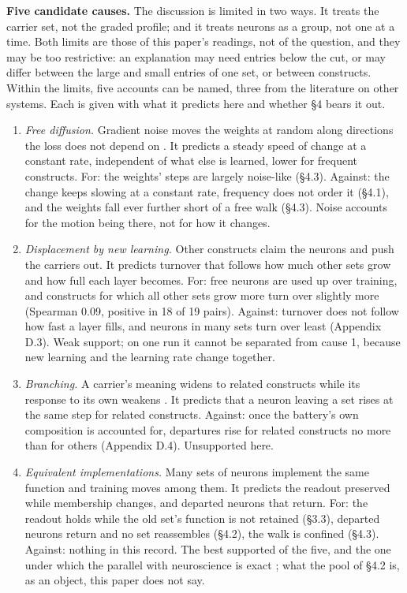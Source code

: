 \documentclass{article}
\begin{document}
\textbf{Five candidate causes.} The discussion is limited in two ways. It treats the carrier set, not the graded profile; and it treats neurons as a group, not one at a time. Both limits are those of this paper's readings, not of the question, and they may be too restrictive: an explanation may need entries below the cut, or may differ between the large and small entries of one set, or between constructs. Within the limits, five accounts can be named, three from the literature on other systems. Each is given with what it predicts here and whether \S4 bears it out.

\begin{enumerate}[topsep=2pt,itemsep=1pt,parsep=0pt,partopsep=0pt,leftmargin=*]
\item \emph{Free diffusion.} Gradient noise moves the weights at random along directions the loss does not depend on \citep{pashakhanloo2023}. It predicts a steady speed of change at a constant rate, independent of what else is learned, lower for frequent constructs. For: the weights' steps are largely noise-like (\S4.3). Against: the change keeps slowing at a constant rate, frequency does not order it (\S4.1), and the weights fall ever further short of a free walk (\S4.3). Noise accounts for the motion being there, not for how it changes.
\item \emph{Displacement by new learning.} Other constructs claim the neurons and push the carriers out. It predicts turnover that follows how much other sets grow and how full each layer becomes. For: free neurons are used up over training, and constructs for which all other sets grow more turn over slightly more (Spearman 0.09, positive in 18 of 19 pairs). Against: turnover does not follow how fast a layer fills, and neurons in many sets turn over least (Appendix D.3). Weak support; on one run it cannot be separated from cause 1, because new learning and the learning rate change together.
\item \emph{Branching.} A carrier's meaning widens to related constructs while its response to its own weakens \citep[for vision models]{cammarata2026}. It predicts that a neuron leaving a set rises at the same step for related constructs. Against: once the battery's own composition is accounted for, departures rise for related constructs no more than for others (Appendix D.4). Unsupported here.
\item \emph{Equivalent implementations.} Many sets of neurons implement the same function and training moves among them. It predicts the readout preserved while membership changes, and departed neurons that return. For: the readout holds while the old set's function is not retained (\S3.3), departed neurons return and no set reassembles (\S4.2), the walk is confined (\S4.3). Against: nothing in this record. The best supported of the five, and the one under which the parallel with neuroscience is exact \citep{rule2020}; what the pool of \S4.2 is, as an object, this paper does not say.

\end{enumerate}
\end{document}
